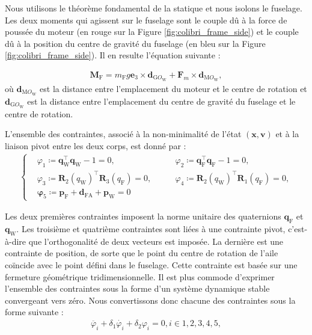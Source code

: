 Nous utilisons le théorème fondamental de la statique et nous isolons le fuselage. Les deux moments qui agissent sur le fuselage sont le couple dû à la force de poussée du moteur (en rouge sur la Figure \eqref{fig:colibri_frame_side}) et le couple dû à la position du centre de gravité du fuselage (en bleu sur la Figure \eqref{fig:colibri_frame_side}). Il en resulte l'équation suivante :

\begin{align}
    \label{eq:momentfuselage}
    \boldsymbol{M}_{\text{F}} =  m_{\text{F}} g \boldsymbol{e}_3 \times \boldsymbol{d}_{\text{G}O_{\text{W}}} + \boldsymbol{F}_{m} \times \boldsymbol{d}_{\text{M}O_{\text{W}}},
\end{align}
où $\boldsymbol{d}_{\text{M}O_{\text{W}}}$ est la distance entre l'emplacement du moteur et le centre de rotation et $\boldsymbol{d}_{\text{G}O_{\text{W}}}$ est la distance entre l'emplacement du centre de gravité du fuselage et le centre de rotation.


L'ensemble des contraintes, associé à la non-minimalité de l'état $(\boldsymbol{x},\boldsymbol{v})$ et à la liaison pivot entre les deux corps, est donné par :
\begin{align}
    \label{eq:contraintes}
    \left\{
    \begin{aligned}
    &\varphi_{1} \coloneqq \boldsymbol{q}_{\text{W}}^\top \boldsymbol{q}_{\text{W}} - 1 = 0, \qquad &\varphi_{2} \coloneqq \boldsymbol{q}_{\text{F}}^\top \boldsymbol{q}_{\text{F}} - 1 = 0,\\
    &\varphi_{3} \coloneqq \boldsymbol{R}_{2}(q_{\text{W}})^\top \boldsymbol{R}_{3}(q_{\text{F}}) = 0, \qquad &\varphi_{4} \coloneqq \boldsymbol{R}_{2}(q_{\text{W}})^\top \boldsymbol{R}_{1}(q_{\text{F}}) = 0,\\
    &\boldsymbol{\varphi}_{5} \coloneqq \boldsymbol{p}_{\text{F}} + \boldsymbol{d}_{\text{FA}} + \boldsymbol{p}_{\text{W}} = 0
    \end{aligned}
    \right.
\end{align}

Les deux premières contraintes imposent la norme unitaire des quaternions $\boldsymbol{q}_{\text{F}}$ et $\boldsymbol{q}_{\text{W}}$.
Les troisième et quatrième contraintes sont liées à une contrainte pivot, c'est-à-dire que l'orthogonalité de deux vecteurs est imposée. La dernière est une contrainte de position, de sorte que le point du centre de rotation de l'aile coïncide avec le point défini dans le fuselage. Cette contrainte est basée sur une fermeture géométrique tridimensionnelle.
Il est plus commode d'exprimer l'ensemble des contraintes sous la forme d'un système dynamique stable convergeant vers zéro. Nous convertissons donc chacune des contraintes sous la forme suivante :
\begin{align}
    \ddot{\varphi_{i}} + \delta_{1} \dot{\varphi_{i}}  + \delta_{2} \varphi_{i} = 0, i \in {1,2,3,4,5},
\end{align}

